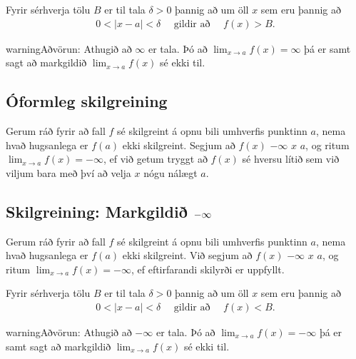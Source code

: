 \documentclass[a4paper,10pt,icelandic]{sphinxmanual}
\begin{document}
Fyrir sérhverja tölu \(B\) er til tala \(\delta>0\) þannig
að um öll \(x\) sem eru þannig að
\begin{equation*}
\begin{split}0 < |x-a| <\delta \quad  \text{ gildir að } \quad f(x) > B.\end{split}
\end{equation*}
\begin{sphinxadmonition}{warning}{Aðvörun:}
Athugið að \(\infty\) er  tala. Þó að
\(\lim_{x\rightarrow a} f(x)=\infty\) þá er samt sagt að markgildið
\(\lim_{x\rightarrow a} f(x)\) sé ekki til.
\end{sphinxadmonition}


\subsection{Óformleg skilgreining}
\label{\detokenize{kafli02:id9}}
Gerum ráð fyrir að fall \(f\) sé skilgreint á opnu bili umhverfis
punktinn \(a\), nema hvað hugsanlega er \(f(a)\) ekki
skilgreint. Segjum að \(f(x)\)  \(-\infty\) 
\(x\)  \(a\), og ritum
\(\lim_{x\rightarrow a} f(x)=-\infty\), ef við getum tryggt að
\(f(x)\) sé hversu lítið sem við viljum bara með því að velja
\(x\) nógu nálægt \(a\).


\subsection{Skilgreining: Markgildið \protect\(-\infty\protect\)}
\label{\detokenize{kafli02:id10}}
Gerum ráð fyrir að fall \(f\) sé skilgreint á opnu bili umhverfis
punktinn \(a\), nema hvað hugsanlega er \(f(a)\) ekki
skilgreint. Við segjum að \(f(x)\)  \(-\infty\)
 \(x\)  \(a\), og ritum
\(\lim_{x\rightarrow a} f(x)=-\infty\), ef eftirfarandi skilyrði er
uppfyllt.

Fyrir sérhverja tölu \(B\) er til tala \(\delta>0\) þannig
að um öll \(x\) sem eru þannig að
\begin{equation*}
\begin{split}0 < |x-a| < \delta \quad \text{ gildir að } \quad f(x)<B.\end{split}
\end{equation*}
\begin{sphinxadmonition}{warning}{Aðvörun:}
Athugið að \(-\infty\) er  tala. Þó að
\(\lim_{x\rightarrow a} f(x)=-\infty\) þá er samt sagt að markgildið
\(\lim_{x\rightarrow a} f(x)\) sé ekki til.
\end{sphinxadmonition}
\end{document}
